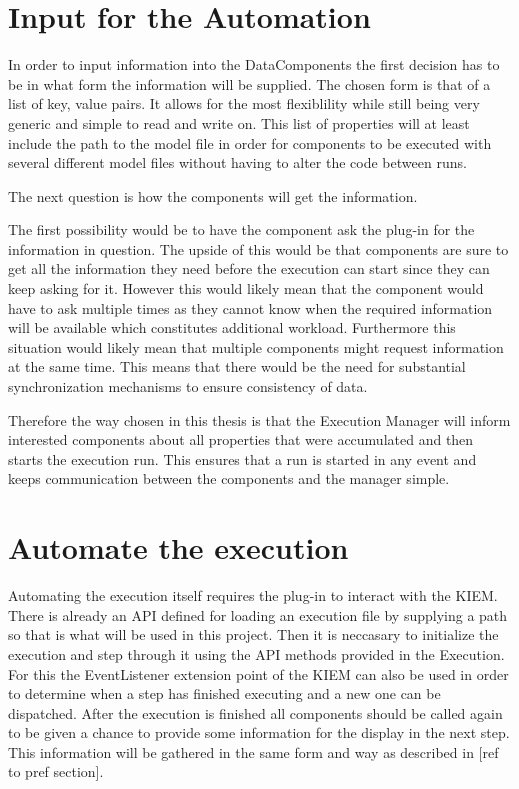 \section{Input for the Automation}
\label{section:AutoConceptsInput}
In order to input information into the DataComponents the first decision has to be in
what form the information will be supplied.
The chosen form is that of a list of key, value pairs. It allows for the most
flexiblility while still being very generic and simple to read and write on.
This list of properties will at least include the path to the model file in order
for components to be executed with several different model files without having
to alter the code between runs.

The next question is how the components will get the information.

The first possibility would be to have the component ask the plug-in for the information
in question. The upside of this would be that components are sure to get all the information
they need before the execution can start since they can keep asking for it. However this would
likely mean that the component would have to ask multiple times as they cannot know when
the required information will be available which constitutes additional workload. Furthermore
this situation would likely mean that multiple components might request information
at the same time. This means that there would be the need for substantial synchronization mechanisms
to ensure consistency of data.

Therefore the way chosen in this thesis is that the Execution Manager will inform interested components
about all properties that were accumulated and then starts the execution run. This ensures
that a run is started in any event and keeps communication between the components and the manager simple.

\section{Automate the execution}
\label{section:AutoConceptsExecution}
Automating the execution itself requires the plug-in to interact with the KIEM.
There is already an API defined for loading an execution file by supplying a path so that
is what will be used in this project.
Then it is neccasary to initialize the execution and step through it using the API
methods provided in the Execution. For this the EventListener extension point of the 
KIEM can also be used in order to determine when a step has finished executing and
a new one can be dispatched.
After the execution is finished all components should be called again to be given
a chance to provide some information for the display in the next step. This information
will be gathered in the same form and way as described in [ref to pref section].


